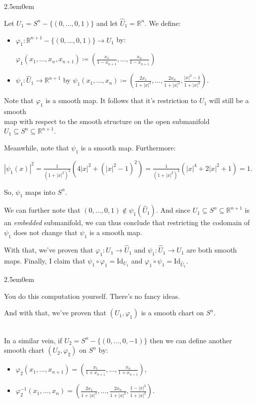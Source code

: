 \documentclass{book}
\newcommand{\pracTwo}{
   \color{Orange}%
   \fontsize{12}{14}\selectfont%
}
\newcommand{\exPPP}{%
   \color{VioletRed}%
   \fontsize{12}{14}\selectfont%
}
\newenvironment{myIndent}{%
   \begin{adjustwidth}{2.5em}{0em}%
}{%
   \end{adjustwidth}%
}
\newcommand{\myId}{\mathrm{Id}}
\newcommand{\mySepThree}[1][.]{%
   {\noindent\color{#1}{\rule{6in}{0.25mm}}}\\%
}
\newcommand{\retTwo}{\hfill\bigbreak}
\begin{document}
\begin{myIndent}\pracTwo
	Let $U_1 = S^n - \{(0, \ldots, 0, 1)\}$ and let $\widehat{U}_1 = \mathbb{R}^n$. We define:
	\begin{itemize}
		\item $\varphi_1 : \mathbb{R}^{n+1} - \{(0, \ldots, 0, 1)\} \to \widehat{U}_1$ by:
		
		{\centering$\varphi_1(x_1, \ldots, x_n, x_{n+1}) \coloneqq (\frac{x_1}{1 - x_{n+1}}, \ldots, \frac{x_n}{1 - x_{n+1}})$\retTwo\par}

		\item $\psi_1 : \widehat{U}_1 \to \mathbb{R}^{n+1}$ by $\psi_1(x_1, \ldots, x_n) \coloneqq (\frac{2x_1}{1 + |x|^2}, \ldots, \frac{2x_n}{1 + |x|^2}, \frac{|x|^2 - 1}{1 + |x|^2})$.\retTwo
	\end{itemize}

	Note that $\varphi_1$ is a smooth map. It follows that it's restriction to $U_1$ will still be a smooth\\ map with respect to the smooth structure on the open submanifold $U_1 \subseteq S^n \subseteq \mathbb{R}^{n+1}$.\retTwo

	Meanwhile, note that $\psi_1$ is a smooth map. Furthermore:
	
	{\centering$|\psi_1(x)|^2 = \frac{1}{(1 + |x|^2)^2}(4|x|^2 + (|x|^2 - 1)^2) =  \frac{1}{(1 + |x|^2)^2}(|x|^4 + 2|x|^2 + 1) = 1$.\retTwo\par}

	So, $\psi_1$ maps into $S^n$. \retTwo

	We can further note that $(0, \ldots, 0, 1) \notin \psi_1(\widehat{U}_1)$. And since $U_1 \subseteq S^n \subseteq \mathbb{R}^{n+1}$ is an \textit{embedded} submanifold, we can thus conclude that restricting the codomain of $\psi_1$ does not change that $\psi_1$ is a smooth map.\retTwo

	With that, we've proven that $\varphi_1: U_1 \to \widehat{U}_1$ and $\psi_1: \widehat{U}_1 \to U_1$ are both smooth maps. Finally, I claim that $\psi_1 \circ \varphi_1 = \myId_{U_1}$ and $\varphi_1 \circ \psi_1 = \myId_{\widehat{U}_1}$.
	\begin{myIndent}\exPPP
		You do this computation yourself. There's no fancy ideas.\retTwo
	\end{myIndent}

	And with that, we've proven that $(U_1, \varphi_1)$ is a smooth chart on $S^n$.\retTwo

	\mySepThree

	In a similar vein, if $U_2 = S^{n} - \{(0, \ldots, 0, -1)\}$ then we can define another smooth chart $(U_2, \varphi_2)$ on $S^{n}$ by:

	\begin{itemize}
		\item $\varphi_2(x_1, \ldots, x_{n+1}) = (\frac{x_1}{1 + x_{n+1}}, \ldots, \frac{x_n}{1 + x_{n+1}})$,
		\item $\varphi_2^{-1}(x_1, \ldots, x_n) = (\frac{2x_1}{1 + |x|^2}, \ldots, \frac{2x_n}{1 + |x|^2}, \frac{1 - |x|^2}{1 + |x|^2})$.\retTwo
	\end{itemize}
\end{myIndent}
\end{document}
